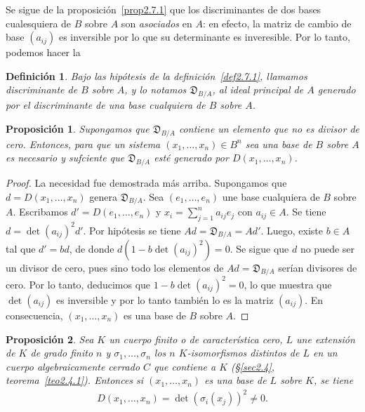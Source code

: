 \documentclass[10pt,oneside,bibtotoc,smallheadings,leqno,a5paper,DIV=12]{scrbook}
\newcommand{\disc}{\mathfrak{D}}
\numberwithin{equation}{section}
\theoremstyle{defi}
\newtheorem{definition}{Definici\'on}
\theoremstyle{enonce}
\newtheorem{proposition}{Proposici\'on}
\theoremstyle{rem}
\numberwithin{theorem}{section}
\numberwithin{proposition}{section}
\numberwithin{definition}{section}
\numberwithin{lemma}{section}
\numberwithin{corollary}{section}
\numberwithin{example}{section}
\numberwithin{footnote}{section}%
\begin{document}
Se sigue de la proposici\'on~\ref{prop2.7.1} que los discriminantes de dos bases cualesquiera de $B$ sobre $A$ son {\em asociados}
en $A$: en efecto, la matriz de cambio de base $(a_{ij})$ es inversible por lo que su determinante es inveresible.
Por lo tanto, podemos hacer la

\begin{definition}\label{def2.7.2}
Bajo las hip\'otesis de la definici\'on~\ref{def2.7.1}, llamamos discriminante de $B$ sobre $A$, y lo notamos $\disc_{B/A}$,
al ideal principal de $A$ generado por el discriminante de una base cualquiera de $B$ sobre $A$.
\end{definition}

\begin{proposition}
Supongamos que $\disc_{B/A}$ contiene un elemento que no es divisor de cero. Entonces, para que un sistema
$(x_{1},\dots,x_{n})\in B^{n}$ sea una base de $B$ sobre $A$ es necesario y sufciente que $\disc_{B/A}$ est\'e
generado por $D(x_{1},\dots,x_{n})$.
\end{proposition}

\begin{proof}
La necesidad fue demostrada m\'as arriba. Supongamos que $d = D(x_{1},\dots,x_{n})$ genera
$\disc_{B/A}$. Sea $(e_{1},\dots,e_{n})$ une base cualquiera de $B$ sobre $A$.
Escribamos $d' = D(e_{1},\dots,e_{n})$ y $x_{i} = \sum_{j=1}^{n}a_{ij}e_{j}$ con $a_{ij}\in A$. Se tiene
$d = \det(a_{ij})^{2}d'$. Por hip\'otesis se tiene $Ad = \disc_{B/A} = Ad'$. Luego, existe $b\in A$ tal que
$d' = bd$, de donde $d(1-b\det(a_{ij})^{2}) = 0$. Se sigue que $d$ no puede ser un divisor de cero, pues sino
todo los elementos de $Ad = \disc_{B/A}$ ser\'ian divisores de cero. Por lo tanto, deducimos que
$1-b\det(a_{ij})^{2} = 0$, lo que muestra que $\det(a_{ij})$ es inversible y por lo tanto tambi\'en lo es
la matriz $(a_{ij})$. En consecuencia, $(x_{1},\dots,x_{n})$ es una base de $B$ sobre $A$.
\end{proof}

\begin{proposition}\label{prop2.7.3}
Sea $K$ un cuerpo finito o de caracter\'istica cero, $L$ une extensi\'on de $K$ de grado finito $n$ y
$\sigma_{1},\dots,\sigma_{n}$ los $n$ $K$-isomorfismos distintos de $L$ en un cuerpo algebraicamente cerrado
$C$ que contiene a $K$ (\S\ref{sec2.4}, teorema~\ref{teo2.4.1}). Entonces si $(x_{1},\dots,x_{n})$ es una base de $L$ sobre $K$, se tiene
\begin{gather}
D(x_{1},\dots,x_{n}) = \det(\sigma_{i}(x_{j}))^{2}\neq 0.
\end{gather}
\end{proposition}
\end{document}
